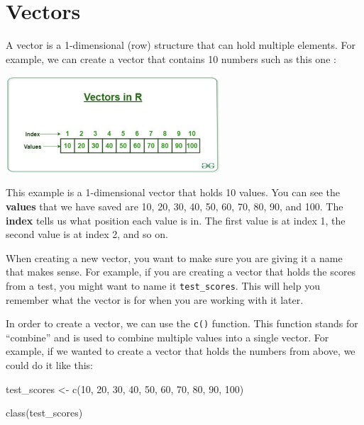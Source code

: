 \documentclass[
  letterpaper,
  DIV=11,
  numbers=noendperiod]{scrreprt}
\newenvironment{Shaded}{\begin{snugshade}}{\end{snugshade}}
\newcommand{\DecValTok}[1]{\textcolor[rgb]{0.68,0.00,0.00}{#1}}
\newcommand{\FunctionTok}[1]{\textcolor[rgb]{0.28,0.35,0.67}{#1}}
\newcommand{\NormalTok}[1]{\textcolor[rgb]{0.00,0.23,0.31}{#1}}
\newcommand{\OtherTok}[1]{\textcolor[rgb]{0.00,0.23,0.31}{#1}}
\begin{document}
\section*{Vectors}\label{vectors}


A vector is a 1-dimensional (row) structure that can hold multiple
elements. For example, we can create a vector that contains 10 numbers
such as this one :

\includegraphics[width=0.6\textwidth,height=\textheight]{./images/Vector-1.jpg}

This example is a 1-dimensional vector that holds 10 values. You can see
the \textbf{values} that we have saved are 10, 20, 30, 40, 50, 60, 70,
80, 90, and 100. The \textbf{index} tells us what position each value is
in. The first value is at index 1, the second value is at index 2, and
so on.

When creating a new vector, you want to make sure you are giving it a
name that makes sense. For example, if you are creating a vector that
holds the scores from a test, you might want to name it
\texttt{test\_scores}. This will help you remember what the vector is
for when you are working with it later.

In order to create a vector, we can use the \texttt{c()} function. This
function stands for ``combine'' and is used to combine multiple values
into a single vector. For example, if we wanted to create a vector that
holds the numbers from above, we could do it like this:

\begin{Shaded}
\begin{Highlighting}[]
\NormalTok{test\_scores }\OtherTok{\textless{}{-}} \FunctionTok{c}\NormalTok{(}\DecValTok{10}\NormalTok{, }\DecValTok{20}\NormalTok{, }\DecValTok{30}\NormalTok{, }\DecValTok{40}\NormalTok{, }\DecValTok{50}\NormalTok{, }\DecValTok{60}\NormalTok{, }\DecValTok{70}\NormalTok{, }\DecValTok{80}\NormalTok{, }\DecValTok{90}\NormalTok{, }\DecValTok{100}\NormalTok{)}

\FunctionTok{class}\NormalTok{(test\_scores)}
\end{Highlighting}
\end{Shaded}
\end{document}
